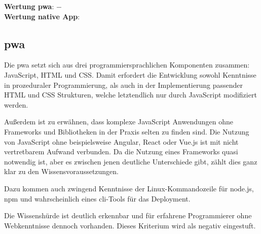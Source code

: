 \textbf{Wertung \ac{pwa}}: $-$\\
\textbf{Wertung native App}:  \\

\subsection{\ac{pwa}}
Die \ac{pwa} setzt sich aus drei programmiersprachlichen Komponenten zusammen: JavaScript, HTML und CSS. Damit erfordert die Entwicklung sowohl Kenntnisse in prozeduraler Programmierung, als auch in der Implementierung passender HTML und CSS Strukturen, welche letztendlich nur durch JavaScript modifiziert werden.

Außerdem ist zu erwähnen, dass komplexe JavaScript Anwendungen ohne Frameworks und Bibliotheken in der Praxis selten zu finden sind. Die Nutzung von JavaScript ohne beispielsweise Angular, React oder Vue.js ist mit nicht vertretbarem Aufwand verbunden. Da die Nutzung eines Frameworks quasi notwendig ist, aber es zwischen jenen deutliche Unterschiede gibt, zählt dies ganz klar zu den Wissensvoraussetzungen.

Dazu kommen auch zwingend Kenntnisse der Linux-Kommandozeile für node.js, npm und wahrscheinlich eines \ac{cli}-Tools für das Deployment.

Die Wissenshürde ist deutlich erkennbar und für erfahrene Programmierer ohne Webkenntnisse dennoch vorhanden. Dieses Kriterium wird als negativ eingestuft.  